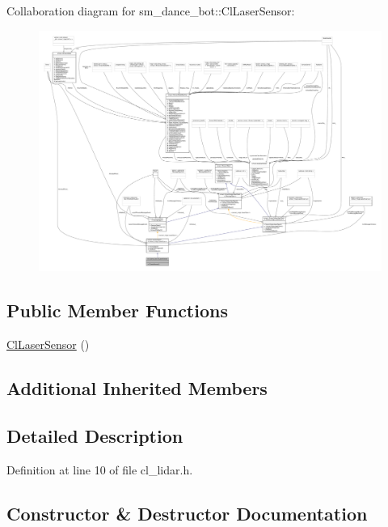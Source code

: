 Collaboration diagram for sm\+\_\+dance\+\_\+bot\+:\+:Cl\+Laser\+Sensor\+:
\nopagebreak
\begin{figure}[H]
\begin{center}
\leavevmode
\includegraphics[width=350pt]{classsm__dance__bot_1_1ClLaserSensor__coll__graph}
\end{center}
\end{figure}
\subsection*{Public Member Functions}
\begin{DoxyCompactItemize}
\item 
\hyperlink{classsm__dance__bot_1_1ClLaserSensor_a6854f1066ac7e978d0a139ed403b36ec}{Cl\+Laser\+Sensor} ()
\end{DoxyCompactItemize}
\subsection*{Additional Inherited Members}


\subsection{Detailed Description}


Definition at line 10 of file cl\+\_\+lidar.\+h.



\subsection{Constructor \& Destructor Documentation}

